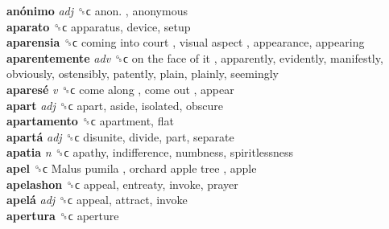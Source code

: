 \textbf{anónimo} \emph{adj}  ␝ϲ   anon. , anonymous  \\
\textbf{aparato} ␝ϲ  apparatus, device, setup  \\
\textbf{aparensia} ␝ϲ   coming into court ,  visual aspect , appearance, appearing  \\
\textbf{aparentemente} \emph{adv}  ␝ϲ   on the face of it , apparently, evidently, manifestly, obviously, ostensibly, patently, plain, plainly, seemingly  \\
\textbf{aparesé} \emph{v}  ␝ϲ   come along ,  come out , appear  \\
\textbf{apart} \emph{adj}  ␝ϲ  apart, aside, isolated, obscure  \\
\textbf{apartamento} ␝ϲ  apartment, flat  \\
\textbf{apartá} \emph{adj}  ␝ϲ  disunite, divide, part, separate  \\
\textbf{apatia} \emph{n}  ␝ϲ  apathy, indifference, numbness, spiritlessness  \\
\textbf{apel} ␝ϲ   Malus pumila ,  orchard apple tree , apple  \\
\textbf{apelashon} ␝ϲ  appeal, entreaty, invoke, prayer  \\
\textbf{apelá} \emph{adj}  ␝ϲ  appeal, attract, invoke  \\
\textbf{apertura} ␝ϲ  aperture  \\
